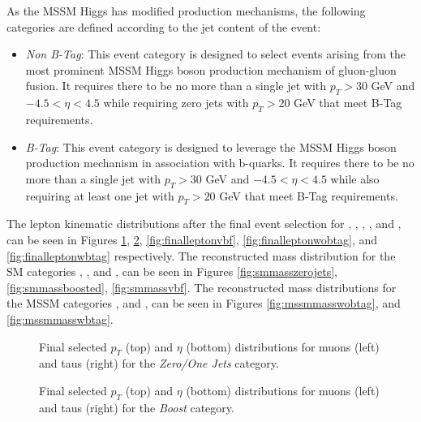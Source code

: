 As the MSSM Higgs has modified production mechanisms, the following categories are defined according to the jet content of the event:
\begin{itemize}
\item \emph{Non B-Tag}: This event category is designed to select events arising from the most prominent MSSM Higgs boson production mechanism of gluon-gluon fusion.
  It requires there to be no more than a single jet with $p_{T} > 30$ GeV and $-4.5 < \eta < 4.5$ while requiring zero jets with $p_{T} > 20$ GeV that meet B-Tag requirements.
\item \emph{B-Tag}: This event category is designed to leverage the MSSM Higgs boson production mechanism in association with b-quarks.
  It requires there to be no more than a single jet with $p_{T} > 30$ GeV and $-4.5 < \eta < 4.5$ while also requiring at least one jet with $p_{T} > 20$ GeV that meet B-Tag requirements.
\end{itemize}
The lepton kinematic distributions after the final event selection for \zeroJets, \boosted, \vbf, \wBtag, and \woBtag, can be seen in Figures \ref{fig:finalleptonzerojets}, \ref{fig:finalleptonboosted}, \ref{fig:finalleptonvbf}, \ref{fig:finalleptonwobtag}, and \ref{fig:finalleptonwbtag} respectively.
The reconstructed mass distribution for the SM categories \zeroJets, \boosted, and \vbf, can be seen in Figures \ref{fig:smmasszerojets}, \ref{fig:smmassboosted}, \ref{fig:smmassvbf}. 
The reconstructed mass distributions for the MSSM categories \woBtag, and \wBtag, can be seen in Figures \ref{fig:mssmmasswobtag}, and \ref{fig:mssmmasswbtag}.



\begin{figure}[ht]

%
%
\caption{Final selected $p_{T}$ (top) and $\eta$ (bottom) distributions for muons (left) and  taus (right) for the \emph{Zero/One Jets} category.}
\label{fig:finalleptonzerojets}
\end{figure}

\begin{figure}[ht]

%
%
\caption{Final selected $p_{T}$ (top) and $\eta$ (bottom) distributions for muons (left) and  taus (right) for the \emph{Boost} category.}
\label{fig:finalleptonboosted}
\end{figure}

